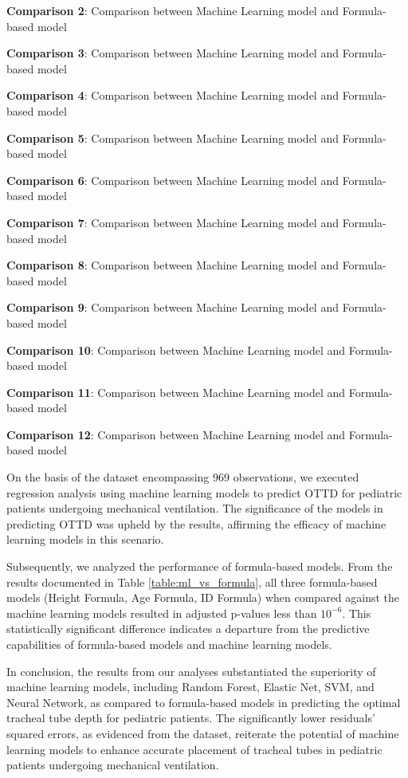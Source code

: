 \documentclass[11pt]{article}
\begin{document}
\begin{table}[h]
\begin{threeparttable}
\begin{tablenotes}
\item \textbf{Comparison 2}: Comparison between Machine Learning model and Formula-based model
\item \textbf{Comparison 3}: Comparison between Machine Learning model and Formula-based model
\item \textbf{Comparison 4}: Comparison between Machine Learning model and Formula-based model
\item \textbf{Comparison 5}: Comparison between Machine Learning model and Formula-based model
\item \textbf{Comparison 6}: Comparison between Machine Learning model and Formula-based model
\item \textbf{Comparison 7}: Comparison between Machine Learning model and Formula-based model
\item \textbf{Comparison 8}: Comparison between Machine Learning model and Formula-based model
\item \textbf{Comparison 9}: Comparison between Machine Learning model and Formula-based model
\item \textbf{Comparison 10}: Comparison between Machine Learning model and Formula-based model
\item \textbf{Comparison 11}: Comparison between Machine Learning model and Formula-based model
\item \textbf{Comparison 12}: Comparison between Machine Learning model and Formula-based model
\end{tablenotes}
\end{threeparttable}
\end{table}


On the basis of the dataset encompassing 969 observations, we executed regression analysis using machine learning models to predict OTTD for pediatric patients undergoing mechanical ventilation. The significance of the models in predicting OTTD was upheld by the results, affirming the efficacy of machine learning models in this scenario.

Subsequently, we analyzed the performance of formula-based models. From the results documented in Table {}\ref{table:ml_vs_formula}, all three formula-based models (Height Formula, Age Formula, ID Formula) when compared against the machine learning models resulted in adjusted p-values less than $10^{-6}$. This statistically significant difference indicates a departure from the predictive capabilities of formula-based models and machine learning models.

In conclusion, the results from our analyses substantiated the superiority of machine learning models, including Random Forest, Elastic Net, SVM, and Neural Network, as compared to formula-based models in predicting the optimal tracheal tube depth for pediatric patients. The significantly lower residuals' squared errors, as evidenced from the dataset, reiterate the potential of machine learning models to enhance accurate placement of tracheal tubes in pediatric patients undergoing mechanical ventilation.
\end{document}
